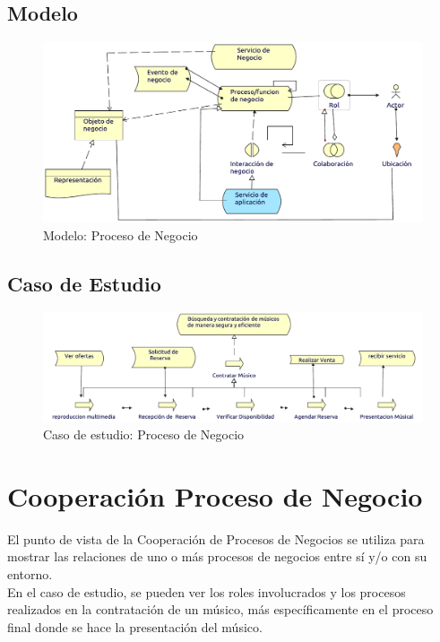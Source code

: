 \subsection{Modelo}
\begin{figure}[h!]
	\centering
	\includegraphics[width=\linewidth]{Arquitectura/Negocio/imgs/ProcesoNegocioMetamodelo.pdf}
	\caption{Modelo: Proceso de Negocio}
\end{figure}
\newpage
\subsection{Caso de Estudio}

\begin{figure}[h!]
	\centering
	\includegraphics[width=\linewidth]{Arquitectura/Negocio/imgs/ProcesoNegocio.pdf}
	\caption{Caso de estudio:  Proceso de Negocio}
\end{figure}
\newpage

\section{Cooperación Proceso de Negocio}
El punto de vista de la Cooperación de Procesos de Negocios se utiliza para mostrar las relaciones de uno o más procesos de negocios entre sí y/o con su entorno. \\

En el caso de estudio, se pueden ver los roles involucrados y los procesos realizados en la contratación de un músico, más específicamente en el proceso final donde se hace la presentación del músico.
